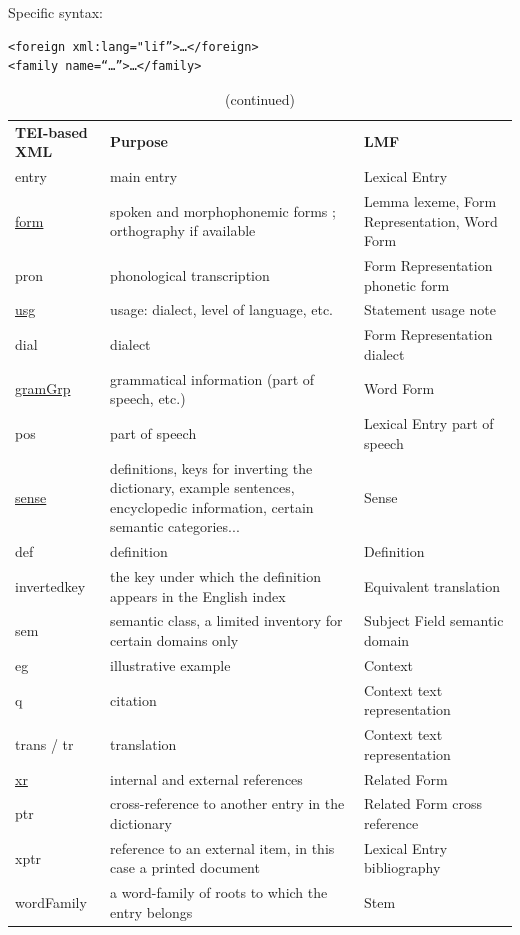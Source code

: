 \documentclass[a4paper,12pt]{article}
\begin{document}
Specific syntax:
\begin{lstlisting}[caption=Limbu syntax]
<foreign xml:lang="lif”>…</foreign>
<family name=“…”>…</family>
\end{lstlisting}

\begin{center}
\begin{longtable}{|p{4cm}|p{5cm}|p{6cm}|}
\caption[]{Limbu dictionary: matching between XML and LMF} \\ \hline
\endfirsthead
\caption[]{(continued)} \\
\endhead
\endfoot
\endlastfoot
\textbf{TEI-based XML} & \textbf{Purpose} & \textbf{LMF} \\ \hline
entry & main entry & Lexical Entry \\ \hline\hline
\underline{form} & spoken and morphophonemic forms ; orthography if available & Lemma lexeme, Form Representation, Word Form\\ \hline
pron & phonological transcription & Form Representation phonetic form \\ \hline\hline
\underline{usg} & usage: dialect, level of language, etc. & Statement usage note \\ \hline
dial & dialect &  Form Representation dialect \\ \hline\hline
\underline{gramGrp} & grammatical information (part of speech, etc.) & Word Form \\ \hline
pos & part of speech & Lexical Entry part of speech \\ \hline\hline
\underline{sense} & definitions, keys for inverting the dictionary, example sentences, encyclopedic information, certain semantic categories... & Sense \\ \hline
def & definition & Definition \\ \hline
invertedkey & the key under which the definition appears in the English index & Equivalent translation \\ \hline
sem & semantic class, a limited inventory for certain domains only & Subject Field semantic domain \\ \hline
eg & illustrative example & Context \\ \hline
q & citation & Context text representation \\ \hline
trans / tr & translation & Context text representation \\ \hline\hline
\underline{xr} & internal and external references & Related Form \\ \hline
ptr & cross-reference to another entry in the dictionary & Related Form cross reference \\ \hline
xptr & reference to an external item, in this case a printed document & Lexical Entry bibliography \\ \hline
wordFamily & a word-family of roots to which the entry belongs & Stem \\ \hline
\end{longtable}
\end{center}
\end{document}
